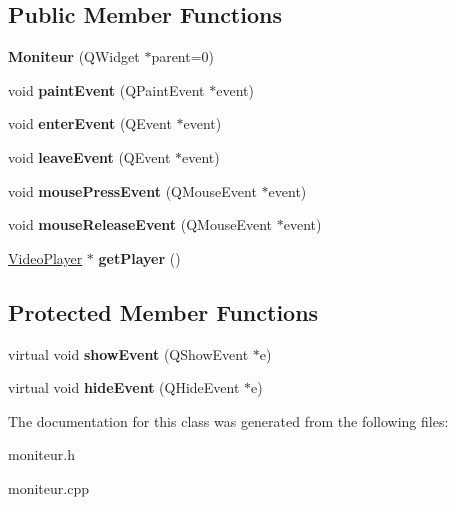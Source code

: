 \subsection*{\-Public \-Member \-Functions}
\begin{DoxyCompactItemize}
\item 
\hypertarget{class_moniteur_a102866e2f68e83d1a28f4b116201e8cd}{{\bfseries \-Moniteur} (\-Q\-Widget $\ast$parent=0)}\label{class_moniteur_a102866e2f68e83d1a28f4b116201e8cd}

\item 
\hypertarget{class_moniteur_a148e1a44aaa27fa1a14be777a208d989}{void {\bfseries paint\-Event} (\-Q\-Paint\-Event $\ast$event)}\label{class_moniteur_a148e1a44aaa27fa1a14be777a208d989}

\item 
\hypertarget{class_moniteur_a6883b4cba5d54584280f9e029bb8844e}{void {\bfseries enter\-Event} (\-Q\-Event $\ast$event)}\label{class_moniteur_a6883b4cba5d54584280f9e029bb8844e}

\item 
\hypertarget{class_moniteur_a61d1e4bc765487ecc9a8817b6cafc562}{void {\bfseries leave\-Event} (\-Q\-Event $\ast$event)}\label{class_moniteur_a61d1e4bc765487ecc9a8817b6cafc562}

\item 
\hypertarget{class_moniteur_a1584bd3068a535c8be9add7fa8ea6755}{void {\bfseries mouse\-Press\-Event} (\-Q\-Mouse\-Event $\ast$event)}\label{class_moniteur_a1584bd3068a535c8be9add7fa8ea6755}

\item 
\hypertarget{class_moniteur_a1af1b4a0b4b67f9fdac9c8fe13b49898}{void {\bfseries mouse\-Release\-Event} (\-Q\-Mouse\-Event $\ast$event)}\label{class_moniteur_a1af1b4a0b4b67f9fdac9c8fe13b49898}

\item 
\hypertarget{class_moniteur_af4ac90c4a3946ccc7161537b28bbd3d4}{\hyperlink{class_video_player}{\-Video\-Player} $\ast$ {\bfseries get\-Player} ()}\label{class_moniteur_af4ac90c4a3946ccc7161537b28bbd3d4}

\end{DoxyCompactItemize}
\subsection*{\-Protected \-Member \-Functions}
\begin{DoxyCompactItemize}
\item 
\hypertarget{class_moniteur_ab5f30f05887d8d55eab4c6613ef9dfb0}{virtual void {\bfseries show\-Event} (\-Q\-Show\-Event $\ast$e)}\label{class_moniteur_ab5f30f05887d8d55eab4c6613ef9dfb0}

\item 
\hypertarget{class_moniteur_aaf16b8552f13455d6abf941cad688f58}{virtual void {\bfseries hide\-Event} (\-Q\-Hide\-Event $\ast$e)}\label{class_moniteur_aaf16b8552f13455d6abf941cad688f58}

\end{DoxyCompactItemize}


\-The documentation for this class was generated from the following files\-:\begin{DoxyCompactItemize}
\item 
moniteur.\-h\item 
moniteur.\-cpp\end{DoxyCompactItemize}
